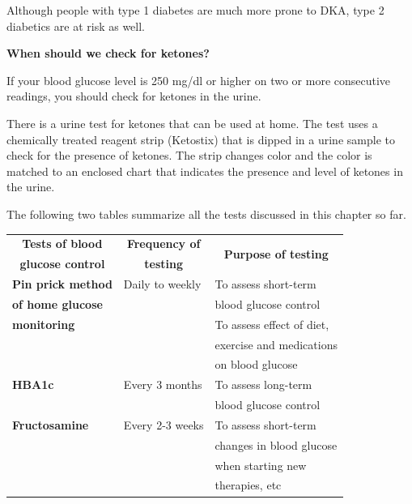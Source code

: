 Although people with type 1 diabetes are much more prone to DKA, type 2 diabetics are at risk as well.

\noindent\textbf{When should we check for ketones?}

If your blood glucose level is 250 mg/dl or higher on two or more consecutive readings, you should check for ketones in the urine.

There is a urine test for ketones that can be used at home. The test uses a chemically treated reagent strip (Ketostix) that is dipped in a urine sample to check for the presence of ketones. The strip changes color and the color is matched to an enclosed chart that indicates the presence and level of ketones in the urine.


The following two tables summarize all the tests discussed in this chapter so far.

{
\begin{center}
\centering
\small\addtolength{\tabcolsep}{-3pt}
\begin{tabular}{|l|l|l|}
\hline
\multicolumn{1}{|c|}{\textbf{Tests of blood}}  & \multicolumn{1}{c|}{\textbf{Frequency of}} & \multicolumn{1}{c|}{\multirow{2}{2.8cm}{\textbf{Purpose of testing}}}\\
\multicolumn{1}{|c|}{\textbf{glucose control}}  & \multicolumn{1}{c|}{\textbf{testing}} & \\
\hline
\textbf{Pin prick method} & Daily to weekly & To assess short-term\\
\textbf{of home glucose} &  & blood glucose control\\
\textbf{monitoring} &  & To assess effect of diet,\\
 &  & exercise and medications\\
 &  & on blood glucose\\
\hline
\textbf{HBA1c} & Every 3 months & To assess long-term\\
 &  & blood glucose control\\
\hline
\textbf{Fructosamine} & Every 2-3 weeks & To assess short-term\\
 &  & changes in blood glucose\\
 &  & when starting new\\
 &  & therapies, etc\\
\hline
\end{tabular}
\end{center}
}\relax

\vskip 8pt


